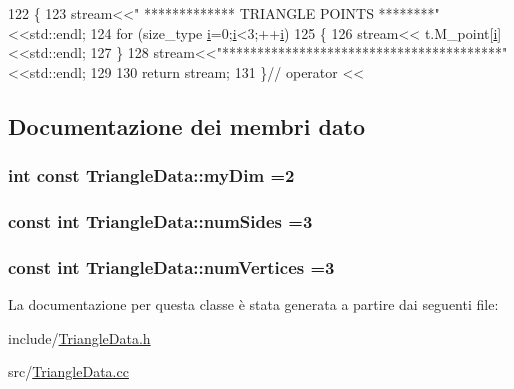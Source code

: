 \begin{DoxyCode}
122 \{
123     stream<<\textcolor{stringliteral}{" ************* TRIANGLE  POINTS ********"}<<std::endl;
124     \textcolor{keywordflow}{for} (size\_type \hyperlink{matrici_8m_a6f6ccfcf58b31cb6412107d9d5281426}{i}=0;\hyperlink{matrici_8m_a6f6ccfcf58b31cb6412107d9d5281426}{i}<3;++\hyperlink{matrici_8m_a6f6ccfcf58b31cb6412107d9d5281426}{i})
125     \{
126         stream<< t.M\_point[\hyperlink{matrici_8m_a6f6ccfcf58b31cb6412107d9d5281426}{i}]<<std::endl;
127     \}
128     stream<<\textcolor{stringliteral}{"****************************************"}<<std::endl;
129     
130     \textcolor{keywordflow}{return} stream;
131 \}\textcolor{comment}{// operator <<}
\end{DoxyCode}


\subsection{Documentazione dei membri dato}
\hypertarget{classTriangleData_aba0f696d79a127708f9cd73ffaa13ec9}{
\subsubsection[{my\-Dim}]{\setlength{\rightskip}{0pt plus 5cm}int const Triangle\-Data\-::my\-Dim =2\hspace{0.3cm}{\ttfamily [static]}}}\label{classTriangleData_aba0f696d79a127708f9cd73ffaa13ec9}
\hypertarget{classTriangleData_a9c499ade75343930cf6722c8e39d9485}{
\subsubsection[{num\-Sides}]{\setlength{\rightskip}{0pt plus 5cm}const int Triangle\-Data\-::num\-Sides =3\hspace{0.3cm}{\ttfamily [static]}}}\label{classTriangleData_a9c499ade75343930cf6722c8e39d9485}
\hypertarget{classTriangleData_a30d9f452a2cab5b864084d13b7076908}{
\subsubsection[{num\-Vertices}]{\setlength{\rightskip}{0pt plus 5cm}const int Triangle\-Data\-::num\-Vertices =3\hspace{0.3cm}{\ttfamily [static]}}}\label{classTriangleData_a30d9f452a2cab5b864084d13b7076908}


La documentazione per questa classe è stata generata a partire dai seguenti file\-:\begin{DoxyCompactItemize}
\item 
include/\hyperlink{TriangleData_8h}{Triangle\-Data.\-h}\item 
src/\hyperlink{TriangleData_8cc}{Triangle\-Data.\-cc}\end{DoxyCompactItemize}

